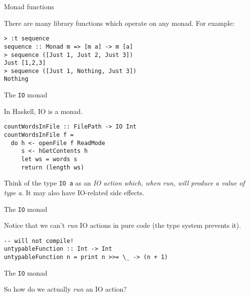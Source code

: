 %
\begin{frame}[fragile]{Monad functions}

There are many library functions which operate on any monad. For example:

\begin{block}{}
\begin{verbatim}
> :t sequence
sequence :: Monad m => [m a] -> m [a]
> sequence ([Just 1, Just 2, Just 3])
Just [1,2,3]
> sequence ([Just 1, Nothing, Just 3])
Nothing
\end{verbatim}
\end{block}

\end{frame}

%
\begin{frame}[fragile]{The \texttt{IO} monad}

In Haskell, IO is a monad.

\begin{block}{}
\begin{verbatim}
countWordsInFile :: FilePath -> IO Int
countWordsInFile f = 
  do h <- openFile f ReadMode
     s <- hGetContents h
     let ws = words s
     return (length ws)
\end{verbatim}
\end{block}

Think of the type \texttt{IO a} as an \emph{IO action which, when run, will
produce a value of type a}. It may also have IO-related side effects.

\end{frame}

%
\begin{frame}[fragile]{The \texttt{IO} monad}

Notice that we can't \emph{run} IO actions in pure code (the type system
prevents it).

\begin{block}{}
\begin{verbatim}
-- will not compile!
untypableFunction :: Int -> Int
untypableFunction n = print n >>= \_ -> (n + 1)
\end{verbatim}
\end{block}

\end{frame}

%
\begin{frame}[fragile]{The \texttt{IO} monad}

So how do we actually \emph{run} an IO action?

\end{frame}


